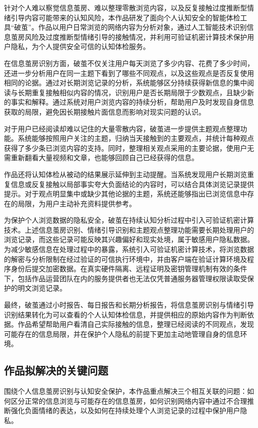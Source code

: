 针对个人难以察觉信息茧房、难以整理零散浏览内容，以及反复接触过度推断型情绪引导内容可能带来的认知风险，本作品研发了面向个人认知安全的智能体检工具``破茧''。作品以用户日常浏览的网络内容为分析对象，通过人工智能技术识别信息茧房风险及过度推断型情绪引导的接触情况，并利用可验证机密计算技术保护用户隐私，为个人提供安全可信的认知体检服务。

在信息茧房识别方面，破茧不仅关注用户每天浏览了多少内容、花费了多少时间，还进一步分析用户在同一主题下看到了哪些不同观点，以及这些观点是否反复使用相同的论据。通过对长期浏览记录的分析，系统能够区分持续获得新信息的集中阅读与长期重复接触相似内容的情况，识别用户是否长期局限于少数观点，且缺少新的事实和解释。通过系统对用户浏览内容的持续分析，帮助用户及时发现自身信息获取的局限，避免因长期接触片面信息而影响对现实问题的认识。

对于用户已经阅读却难以记住的大量零散内容，破茧进一步提供主题观点整理功能。系统能够按照用户关注的主题，归纳当天接触到的主要观点，并统计每种观点获得了多少条已浏览内容的支持。同时，整理相关观点采用的主要论据，使用户无需重新翻看大量视频和文章，也能够回顾自己已经获得的信息。

作品还将认知体检从被动的结果展示延伸到主动提醒。当系统发现用户长期浏览重复信息或反复接触以局部事实夸大负面结论的内容时，可以结合具体浏览记录提供提示。对于观点明显集中或缺少其他论据的主题，系统还能够指出已浏览信息中存在的局限，为用户主动补充资料提供参考。

为保护个人浏览数据的隐私安全，破茧在持续认知分析过程中引入可验证机密计算技术。上述信息茧房识别、情绪引导识别和主题观点整理功能需要长期处理用户的浏览记录，而这些记录可能反映其兴趣偏好和现实处境，属于敏感用户隐私数据。为减少敏感信息在处理过程中的暴露，系统引入可验证机密计算技术，将浏览数据的解密与分析限制在经过验证的可信执行环境中，并由客户端在验证计算环境及程序身份后提交加密数据。在真实硬件隔离、远程证明及密钥管理机制有效的条件下，包括作品运营团队在内的服务提供者也无法仅凭普通服务器管理权限读取受保护的明文浏览记录。

最终，破茧通过小时报告、每日报告和长期分析报告，将信息茧房识别与情绪引导识别结果转化为可以查看的个人认知体检信息，并提供相应的原始内容作为判断依据。作品希望帮助用户看清自己实际接触的信息，整理已经阅读的不同观点，发现可能存在的信息局限，并在保护个人隐私的前提下更加主动地管理自身的信息环境。

\subsection{作品拟解决的关键问题}\label{section:1.2}

围绕个人信息茧房识别与认知安全保护，本作品重点解决三个相互关联的问题：如何区分正常的信息浏览与可能存在的信息茧房，如何识别网络内容中通过不合理推断强化负面情绪的表达，以及如何在持续处理个人浏览记录的过程中保护用户隐私。

